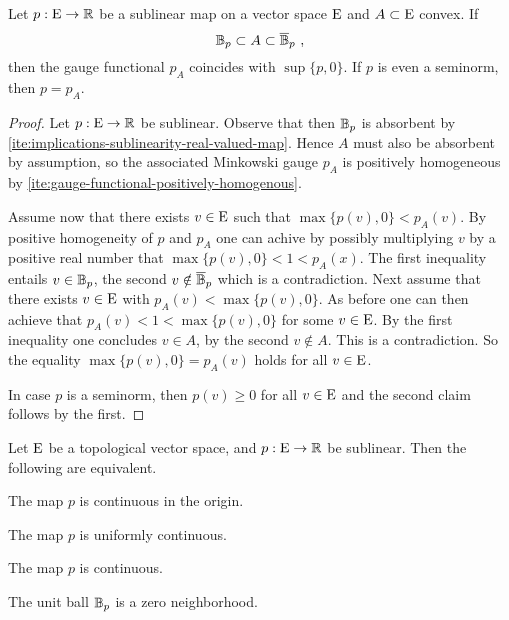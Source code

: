 \begin{lemma}
  Let $p:\mathrm{E} \to\mathbb{R}$ be a sublinear map on a vector space $\mathrm{E}$ and
  $A\subset \mathrm{E}$ convex. If
  \[ \ball_p  \subset A \subset \closedball_p \ ,\]
  then the gauge functional $p_A$ coincides with $\sup \{p,0\} $. If $p$ is even
  a seminorm, then $p=p_A$. 
\end{lemma}

\begin{proof}
  Let $p:\mathrm{E}\to\mathbb{R}$ be sublinear. Observe that then  $\mathbb{B}_p$ is absorbent by
  \ref{ite:implications-sublinearity-real-valued-map}.
  Hence $A$ must also be absorbent by assumption, so the associated Minkowski gauge $p_A$ is
  positively homogeneous by
  \ref{ite:gauge-functional-positively-homogenous}. 
  
  Assume now that there exists $v\in\mathrm{E}$ such that $\max\{p(v),0 \} < p_A(v)$. By positive
  homogeneity of $p$ and $p_A$
  one can achive by possibly multiplying $v$ by a positive real number that $\max\{p(v),0 \} < 1 < p_A(x)$.  The first
  inequality entails $v \in  \mathbb{B}_p$, the second $v\notin \overline{\mathbb{B}}_p $ which is a contradiction.
  Next assume that there exists $v\in\mathrm{E}$ with $p_A(v) < \max\{p(v),0 \}$. As before one can then achieve that
  $ p_A(v) < 1 < \max\{p(v),0 \}$ for some $v\in\mathrm{E}$. By the first inequality one concludes $v \in  A$,
  by the second $v \notin A$. This is a contradiction. So the equality $\max\{p(v),0 \} = p_A(v)$ holds for all $v\in \mathrm{E}$. 
  
  In case $p$ is a seminorm, then $p(v) \geq 0$ for all $v\in \mathrm{E}$ and the second claim follows by the first. 
\end{proof}

\begin{proposition}
  Let $\mathrm{E}$ be a topological vector space, and $p:\mathrm{E} \to \mathbb{R}$ be sublinear. Then the following are equivalent.
  \begin{romanlist}
  \item\label{ite:continuity-sublinear-map-origin}
    The map $p$ is continuous in the origin. 
  \item\label{ite:uniform-continuity-sublinear-map}
    The map $p$ is uniformly continuous.
  \item\label{ite:continuity-sublinear-map}
    The map $p$ is continuous.  
  \item\label{ite:unit-ball-sublinear-map-zero-neighborhood}
    The unit ball $\mathbb{B}_p $ is a zero neighborhood.
  \end{romanlist}
\end{proposition}


